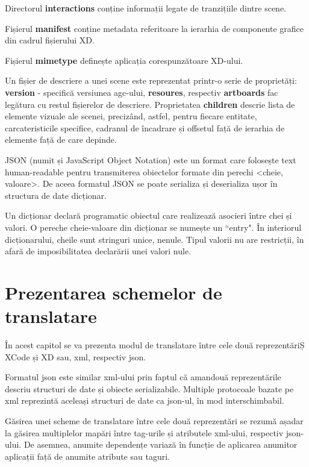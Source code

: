 Directorul \textbf{interactions} conține informații legate de tranzițiile dintre scene.

Fișierul \textbf{manifest} conține metadata referitoare la ierarhia de componente grafice din cadrul fișierului XD. 

Fișierul  \textbf{mimetype} definește aplicația corespunzătoare XD-ului.

Un fișier de descriere a unei scene este reprezentat printr-o serie de proprietăți:  \textbf{version} - specifică versiunea agc-ului, \textbf{resoures}, respectiv \textbf{artboards} fac legătura cu restul fișierelor de descriere. Proprietatea  \textbf{children} descrie lista de elemente vizuale ale scenei, precizând, astfel, pentru fiecare entitate, carcateristicile specifice, cadranul de încadrare și offsetul față de ierarhia de elemente față de care depinde.


JSON (numit și JavaScript Object Notation) este un format care folosește text human-readable pentru transmiterea obiectelor formate din perechi <cheie, valoare>. De aceea formatul JSON se poate serializa și deserializa ușor în structura de date dicționar.

Un dicționar declară programatic obiectul care realizează asocieri între chei și valori. O pereche cheie-valoare din dicționar se numește un ``entry". În interiorul dicționarului, cheile sunt stringuri unice, nenule. Tipul valorii nu are restricții, în afară de imposibilitatea declarării unei valori nule.

\chapter{Prezentarea schemelor de translatare}

În acest capitol se va prezenta modul de translatare între cele două reprezentăriȘ XCode și XD sau, xml, respectiv json. 

Formatul json este similar xml-ului prin faptul că amandouă reprezentările descriu structuri de date și obiecte serializabile. Multiple protocoale bazate pe xml reprezintă aceleași structuri de date ca json-ul, în mod interschimbabil.

Găsirea unei scheme de translatare între cele două reprezentări se rezumă așadar la găsirea multiplelor mapări între tag-urile și atributele xml-ului, respectiv json-ului. De asemnea, anumite dependențe variază în funcție de aplicarea anumitor aplicații față de anumite atribute sau taguri.

